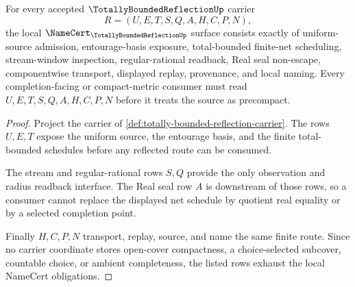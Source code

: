 \begin{theorem}
\label{thm:totally-bounded-reflection-namecert-obligations}
For every accepted $\TotallyBoundedReflectionUp$ carrier
$$
R=(U,E,T,S,Q,A,H,C,P,N),
$$
the local $\NameCert_{\TotallyBoundedReflectionUp}$ surface consists exactly of uniform-source admission, entourage-basis exposure, total-bounded finite-net scheduling, stream-window inspection, regular-rational readback, Real seal non-escape, componentwise transport, displayed replay, provenance, and local naming. Every completion-facing or compact-metric consumer must read $U,E,T,S,Q,A,H,C,P,N$ before it treats the source as precompact.
\end{theorem}
\begin{proof}
Project the carrier of \autoref{def:totally-bounded-reflection-carrier}. The rows $U,E,T$ expose the uniform source, the entourage basis, and the finite total-bounded schedules before any reflected route can be consumed.

The stream and regular-rational rows $S,Q$ provide the only observation and radius readback interface. The Real seal row $A$ is downstream of those rows, so a consumer cannot replace the displayed net schedule by quotient real equality or by a selected completion point.

Finally $H,C,P,N$ transport, replay, source, and name the same finite route. Since no carrier coordinate stores open-cover compactness, a choice-selected subcover, countable choice, or ambient completeness, the listed rows exhaust the local NameCert obligations.
\end{proof}




